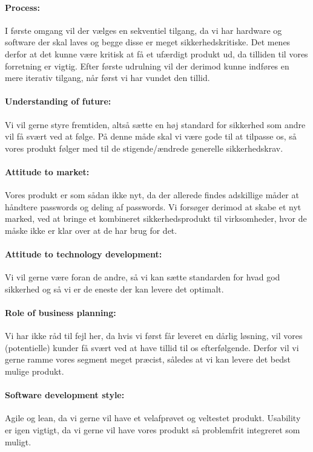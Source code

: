 \paragraph{Process:}I første omgang vil der vælges en sekventiel tilgang, da vi har hardware og software der skal laves og begge disse er meget sikkerhedskritiske.
Det menes derfor at det kunne være kritisk at få et ufærdigt produkt ud, da tilliden til vores forretning er vigtig.
Efter første udrulning vil der derimod kunne indføres en mere iterativ tilgang, når først vi har vundet den tillid.

\paragraph{Understanding of future:}
Vi vil gerne styre fremtiden, altså sætte en høj standard for sikkerhed som andre vil få svært ved at følge.
På denne måde skal vi være gode til at tilpasse os, så vores produkt følger med til de stigende/ændrede generelle sikkerhedskrav.

\paragraph{Attitude to market:} Vores produkt er som sådan ikke nyt, da der allerede findes adskillige måder at håndtere passwords og deling af passwords.
Vi forsøger derimod at skabe et nyt marked, ved at bringe et kombineret sikkerhedsprodukt til virksomheder, hvor de måske ikke er klar over at de har brug for det.

\paragraph{Attitude to technology development:}
Vi vil gerne være foran de andre, så vi kan sætte standarden for hvad god sikkerhed og så vi er de eneste der kan levere det optimalt.

\paragraph{Role of business planning:} Vi har ikke råd til fejl her, da hvis vi først får leveret en dårlig løsning, vil vores (potentielle) kunder få svært ved at have tillid til os efterfølgende.
Derfor vil vi gerne ramme vores segment meget præcist, således at vi kan levere det bedst mulige produkt.

\paragraph{Software development style:} Agile og lean, da vi gerne vil have et velafprøvet og veltestet produkt.
Usability er igen vigtigt, da vi gerne vil have vores produkt så problemfrit integreret som muligt.

